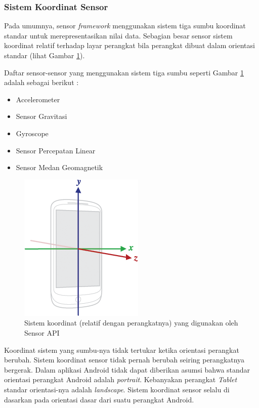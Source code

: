 \subsubsection{Sistem Koordinat Sensor}
\label{sssec:sistem_koordinat_sensor}
Pada umumnya, sensor \textit{framework} menggunakan sistem tiga sumbu koordinat standar untuk merepresentasikan nilai data. Sebagian besar sensor sistem koordinat relatif terhadap layar perangkat bila perangkat dibuat dalam orientasi standar (lihat Gambar \ref{fig:axis-device}).

Daftar sensor-sensor yang menggunakan sistem tiga sumbu seperti Gambar \ref{fig:axis-device} adalah sebagai berikut :

\begin{itemize}
	\item Accelerometer
	\item Sensor Gravitasi
	\item Gyroscope
	\item Sensor Percepatan Linear
	\item Sensor Medan Geomagnetik
\end{itemize}

\begin{figure}[htbp]
	\centering
		\includegraphics[scale=1]{Gambar/axis-device.png}
	\caption{Sistem koordinat (relatif dengan perangkatnya) yang digunakan oleh Sensor API}
	\label{fig:axis-device}
\end{figure}

Koordinat sistem yang sumbu-nya tidak tertukar ketika orientasi perangkat berubah. Sistem koordinat sensor tidak pernah berubah seiring perangkatnya bergerak. Dalam aplikasi Android tidak dapat diberikan asumsi bahwa standar orientasi perangkat Android adalah \textit{portrait}. Kebanyakan perangkat \textit{Tablet} standar orientasi-nya adalah \textit{landscape}. Sistem koordinat sensor selalu di dasarkan pada orientasi dasar dari suatu perangkat Android.

